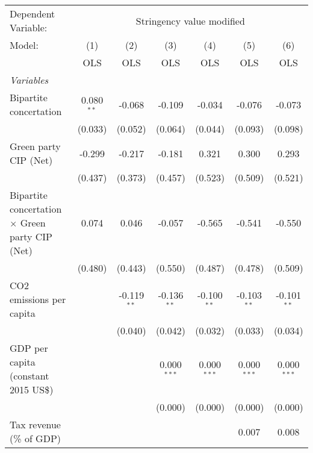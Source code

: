 
\begingroup
\centering
\begin{tabular}{lcccccc}
   \toprule
   Dependent Variable: & \multicolumn{6}{c}{Stringency value modified}\\
   Model:                                                 & (1)          & (2)           & (3)           & (4)           & (5)           & (6)\\  
                                                          &  OLS         & OLS           & OLS           & OLS           & OLS           & OLS\\  
   \midrule
   \emph{Variables}\\
   Bipartite concertation                                 & 0.080$^{**}$ & -0.068        & -0.109        & -0.034        & -0.076        & -0.073\\   
                                                          & (0.033)      & (0.052)       & (0.064)       & (0.044)       & (0.093)       & (0.098)\\   
   Green party CIP (Net)                                  & -0.299       & -0.217        & -0.181        & 0.321         & 0.300         & 0.293\\   
                                                          & (0.437)      & (0.373)       & (0.457)       & (0.523)       & (0.509)       & (0.521)\\   
   Bipartite concertation $\times$ Green party CIP (Net)  & 0.074        & 0.046         & -0.057        & -0.565        & -0.541        & -0.550\\   
                                                          & (0.480)      & (0.443)       & (0.550)       & (0.487)       & (0.478)       & (0.509)\\   
   CO2 emissions per capita                               &              & -0.119$^{**}$ & -0.136$^{**}$ & -0.100$^{**}$ & -0.103$^{**}$ & -0.101$^{**}$\\   
                                                          &              & (0.040)       & (0.042)       & (0.032)       & (0.033)       & (0.034)\\   
   GDP per capita (constant 2015 US\$)                    &              &               & 0.000$^{***}$ & 0.000$^{***}$ & 0.000$^{***}$ & 0.000$^{***}$\\   
                                                          &              &               & (0.000)       & (0.000)       & (0.000)       & (0.000)\\   
   Tax revenue (\% of GDP)                                &              &               &               &               & 0.007         & 0.008\\   

\end{tabular}
